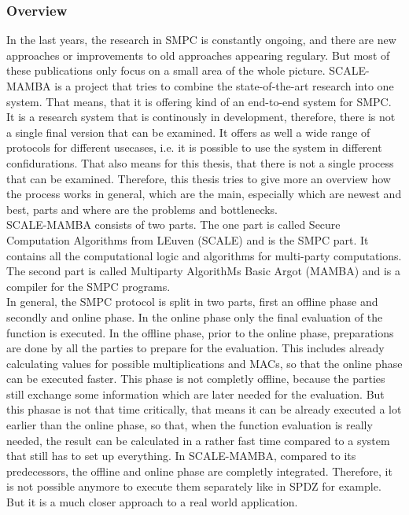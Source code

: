 \documentclass[english,runningheads,a4paper]{llncs}[2018/03/10]
\begin{document}
\subsubsection{Overview}

In the last years, the research in SMPC is constantly ongoing, and there are new approaches or improvements to old approaches appearing regulary. But most of these publications only focus on a small area of the whole picture. SCALE-MAMBA\cite{ScaleMambaDocu} is a project that tries to combine the state-of-the-art research into one system. That means, that it is offering kind of an end-to-end system for SMPC.
It is a research system that is continously in development, therefore, there is not a single final version that can be examined. It offers as well a wide range of protocols for different usecases, i.e. it is possible to use the system in different confidurations. That also means for this thesis, that there is not a single process that can be examined. Therefore, this thesis tries to give more an overview how the process works in general, which are the main, especially which are newest and best, parts and where are the problems and bottlenecks.\\
SCALE-MAMBA consists of two parts. The one part is called Secure Computation Algorithms from LEuven (SCALE) and is the SMPC part. It contains all the computational logic and algorithms for multi-party computations. The second part is called Multiparty AlgorithMs Basic Argot (MAMBA) and is a compiler for the SMPC programs.\\
 
In general, the SMPC protocol is split in two parts, first an offline phase and secondly and online phase. In the online phase only the final evaluation of the function is executed. In the offline phase, prior to the online phase, preparations are done by all the parties to prepare for the evaluation. This includes already calculating values for possible multiplications and MACs, so that the online phase can be executed faster. This phase is not completly offline, because the parties still exchange some information which are later needed for the evaluation. But this phasae is not that time critically, that means it can be already executed a lot earlier than the online phase, so that, when the function evaluation is really needed, the result can be calculated in a rather fast time compared to a system that still has to set up everything. In SCALE-MAMBA, compared to its predecessors, the offline and online phase are completly integrated. Therefore, it is not possible anymore to execute them separately like in SPDZ for example. But it is a much closer approach to a real world application.\\
\end{document}
